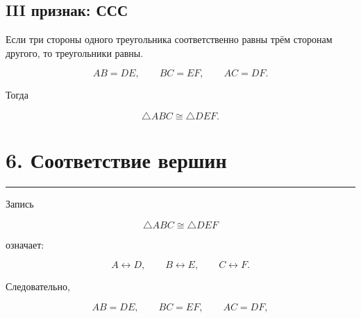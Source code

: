 \documentclass[a4paper,12pt]{article}
\newcommand{\sectionline}{
  \par
  \vspace{0.2em}
  \textcolor{lightline}{\rule{\linewidth}{0.8pt}}
  \par
  \vspace{0.35em}
}
\begin{document}
\subsection*{III признак: ССС}

Если три стороны одного треугольника
соответственно равны трём сторонам другого,
то треугольники равны.

\[
AB=DE,
\qquad
BC=EF,
\qquad
AC=DF.
\]

Тогда

\[
\triangle ABC\cong\triangle DEF.
\]

\begin{center}


\end{center}


\section*{6. Соответствие вершин}
\sectionline

Запись

\[
\triangle ABC\cong\triangle DEF
\]

означает:

\[
A\leftrightarrow D,
\qquad
B\leftrightarrow E,
\qquad
C\leftrightarrow F.
\]

Следовательно,

\[
AB=DE,
\qquad
BC=EF,
\qquad
AC=DF,
\]
\end{document}
